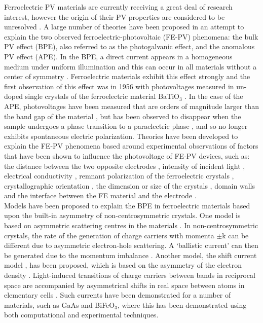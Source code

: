 Ferroelectric PV materials are currently receiving a great deal of research interest, however the origin of their PV properties are considered to be unresolved \cite{Rappe}. A large number of theories have been proposed in an attempt to explain the two observed ferroelectric-photovoltaic (FE-PV) phenomena: the bulk PV effect (BPE), also referred to as the photogalvanic effect, and the anomalous PV effect (APE). In the BPE, a direct current appears in a homogeneous medium under uniform illumination and this can occur in all materials without a center of symmetry  \cite{PGE}. Ferroelectric materials exhibit this effect strongly \cite{Rappe} and the first observation of this effect was in 1956 with photovoltages measured in un-doped single crystals of the ferroelectric material BaTiO$_3$ \cite{keith_46}. In the case of the APE, photovoltages have been measured that are orders of magnitude larger than the band gap of the material \cite{keith_54}, but has been observed to disappear when the sample undergoes a phase transition to a paraelectric phase \cite{nonlinear_dielectric}, and so no longer exhibits spontaneous electric polarization. Theories have been developed to explain the FE-PV phenomena based around experimental observations of factors that have been shown to influence the photovoltage of FE-PV devices, such as:  the distance between the two opposite electrodes \cite{rev_28,rev_46}, intensity of incident light \cite{rev_47}, electrical conductivity \cite{Fridkin}, remnant polarization of the
ferroelectric crystals \cite{rev_48}, crystallographic orientation \cite{rev_49}, the dimension or size of the crystals \cite{rev_46, rev_50}, domain walls \cite{rev_30}
and the interface between the FE material and the electrode \cite{rev_37}.\\

Models have been proposed to explain the BPE in ferroelectric materials based upon the built-in asymmetry of non-centrosymmetric crystals. One model is based on asymmetric scattering centres in the materials \cite{PGE}. In non-centrosymmetric crystals, the rate of the generation of charge carriers with momenta $\pm$k can be different due to asymmetric electron-hole scattering. A `ballistic current' can then be generated due to the momentum imbalance \cite{shift_current}.
Another model, the shift current model \cite{shift_current}, has been proposed, which is based on the asymmetry of the electron density \cite{keith}.
Light-induced transitions of charge carriers between bands in reciprocal space are accompanied by asymmetrical shifts in real space between atoms in elementary cells \cite{shift_current}.
Such currents have been demonstrated for a number of materials, such as GaAs \cite{keith_52} and BiFeO$_3$, where this has been demonstrated using both computational \cite{keith_25} and experimental \cite{keith_51} techniques. \\

